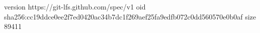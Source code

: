 version https://git-lfs.github.com/spec/v1
oid sha256:cc19ddce0ee2f7ed0420ac34b7dc1f269aef25fa9edfb072c0dd560570e0b0af
size 89411

